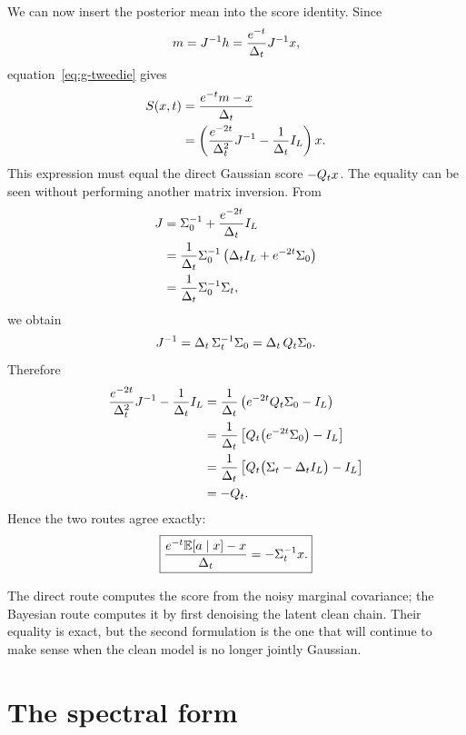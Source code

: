 We can now insert the posterior mean into the score identity. Since
\begin{equation}
  m
  =
  J^{-1}h
  =
  \frac{e^{-t}}{\Delta_t}J^{-1}x,
\end{equation}
equation~\eqref{eq:g-tweedie} gives
\begin{align}
  S(x,t)
  &=
  \frac{e^{-t}m-x}{\Delta_t}\\
  &=
  \left(
    \frac{e^{-2t}}{\Delta_t^2}J^{-1}
    -
    \frac{1}{\Delta_t}I_L
  \right)x.
  \label{eq:g-score-posterior-form}
\end{align}
This expression must equal the direct Gaussian score $-Q_t x$. The equality
can be seen without performing another matrix inversion. From
\begin{align}
  J
  &=
  \Sigma_0^{-1}
  +
  \frac{e^{-2t}}{\Delta_t}I_L\\
  &=
  \frac{1}{\Delta_t}
  \Sigma_0^{-1}
  \left(
    \Delta_t I_L+e^{-2t}\Sigma_0
  \right)\\
  &=
  \frac{1}{\Delta_t}
  \Sigma_0^{-1}\Sigma_t,
\end{align}
we obtain
\begin{equation}
  J^{-1}
  =
  \Delta_t\,\Sigma_t^{-1}\Sigma_0
  =
  \Delta_t\,Q_t\Sigma_0.
  \label{eq:g-Jinv-relation}
\end{equation}
Therefore
\begin{align}
  \frac{e^{-2t}}{\Delta_t^2}J^{-1}
  -
  \frac{1}{\Delta_t}I_L
  &=
  \frac{1}{\Delta_t}
  \left(
    e^{-2t}Q_t\Sigma_0-I_L
  \right)\\
  &=
  \frac{1}{\Delta_t}
  \left[
    Q_t
    \bigl(
      e^{-2t}\Sigma_0
    \bigr)
    -I_L
  \right]\\
  &=
  \frac{1}{\Delta_t}
  \left[
    Q_t
    \bigl(
      \Sigma_t-\Delta_t I_L
    \bigr)
    -I_L
  \right]\\
  &=
  -Q_t.
\end{align}
Hence the two routes agree exactly:
\begin{equation}
  \boxed{
  \frac{e^{-t}\mathbb{E}[a\mid x]-x}{\Delta_t}
  =
  -\Sigma_t^{-1}x.
  }
  \label{eq:g-two-score-routes}
\end{equation}

The direct route computes the score from the noisy marginal covariance;
the Bayesian route computes it by first denoising the latent clean chain.
Their equality is exact, but the second formulation is the one that will
continue to make sense when the clean model is no longer jointly Gaussian.


\section{The spectral form}
\label{sec:g-lifecycle}

